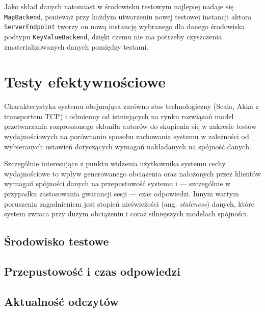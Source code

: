 Jako skład danych natomiast w środowisku testowym najlepiej nadaje się \texttt{MapBackend}, ponieważ przy każdym utworzeniu nowej testowej instancji aktora \texttt{ServerEndpoint} tworzy on nową instancję wybranego dla danego środowiska podtypu \texttt{KeyValueBackend}, dzięki czemu nie ma potrzeby czyszczenia zmaterializowanych danych pomiędzy testami.

\section{Testy efektywnościowe} \label{section:perftests}

Charakterystyka systemu obejmująca zarówno stos technologiczny (Scala, Akka z transportem TCP) i odmienny od istniejących na rynku rozwiązań model przetwarzania rozproszonego skłoniła autorów do skupienia się w zakresie testów wydajnościowych na porównaniu sposobu zachowania systemu w zależności od wybieranych ustawień dotyczących wymagań nakładanych na spójność danych.

Szczególnie interesujące z punktu widzenia użytkownika systemu cechy wydajnościowe to wpływ generowanego obciążenia oraz nałożonych przez klientów wymagań spójności danych na przepustowość systemu i --- szczególnie w przypadku zastosowania gwarancji sesji --- czas odpowiedzi. Innym wartym poruszenia zagadnieniem jest stopień nieświeżości (ang. \textit{staleness}) danych, które system zwraca przy dużym obciążeniu i coraz silniejszych modelach spójności.

\subsection{Środowisko testowe}

\subsection{Przepustowość i czas odpowiedzi}

\subsection{Aktualność odczytów}